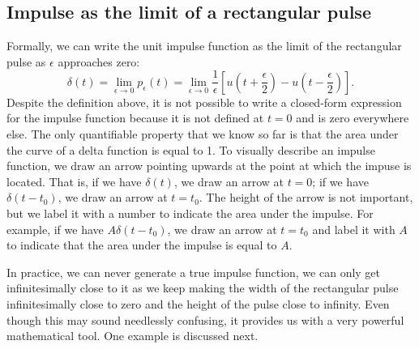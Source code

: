 \documentclass{ee102_notes}
\begin{document}
\subsection{Impulse as the limit of a rectangular pulse}
Formally, we can write the unit impulse function as the limit of the rectangular pulse as $\epsilon$ approaches zero:
\[
\delta(t) = \lim_{\epsilon \to 0} p_\epsilon(t) = \lim_{\epsilon \to 0} \frac{1}{\epsilon} \left[u\left(t + \frac{\epsilon}{2}\right) - u\left(t - \frac{\epsilon}{2}\right)\right].
\]
Despite the definition above, it is not possible to write a closed-form expression for the impulse function because it is not defined at $t = 0$ and is zero everywhere else. The only quantifiable property that we know so far is that the area under the curve of a delta function is equal to 1. To visually describe an impulse function, we draw an arrow pointing upwards at the point at which the impuse is located. That is, if we have $\delta(t)$, we draw an arrow at $t = 0$; if we have $\delta(t - t_0)$, we draw an arrow at $t = t_0$. The height of the arrow is not important, but we label it with a number to indicate the area under the impulse. For example, if we have $A \delta(t - t_0)$, we draw an arrow at $t = t_0$ and label it with $A$ to indicate that the area under the impulse is equal to $A$.

In practice, we can never generate a true impulse function, we can only get infinitesimally close to it as we keep making the width of the rectangular pulse infinitesimally close to zero and the height of the pulse close to infinity. Even though this may sound needlessly confusing, it provides us with a very powerful mathematical tool. One example is discussed next.
\end{document}
